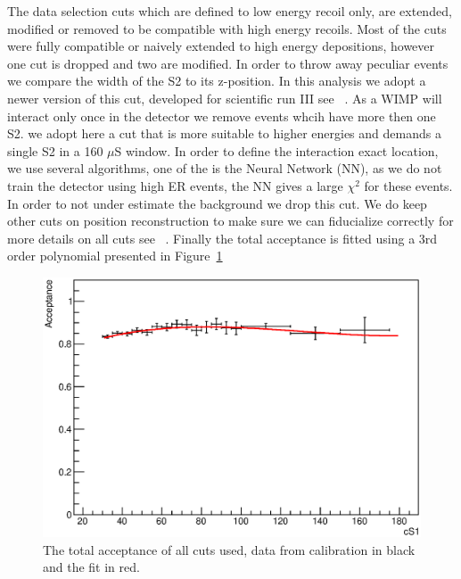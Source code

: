 The data selection cuts which are defined to low energy recoil only, are extended, modified or removed to be compatible with high energy recoils. Most of the cuts were fully compatible or naively extended to high energy depositions, however one cut is dropped and two are modified. In order to throw away peculiar events we compare the width of the S2 to its z-position. In this analysis we adopt a newer version of this cut, developed for scientific run III see ~\cite{xe100_run_combination}. As a WIMP will interact only once in the detector we remove events whcih have more then one S2. we adopt here a cut that is more suitable to higher energies and demands a single S2 in a 160 $\mu$S window. In order to define the interaction exact location, we use several algorithms, one of the is the Neural Network (NN), as we do not train the detector using high ER events, the NN gives a large $\chi^2$ for these events. In order to not under estimate the background we drop this cut. We do keep other cuts on position reconstruction to make sure we can fiducialize correctly for more details on all cuts see ~\cite{xe100_ana2012}. Finally the total acceptance is fitted using a 3rd order polynomial presented in Figure~\ref{fig:Acc}

\begin{figure}[h!]
\begin{minipage}{1.\linewidth}
\centerline{\includegraphics[width=1.\linewidth]{Figures/Acceptance.eps}}
\end{minipage}
\caption{The total acceptance of all cuts used, data from calibration in black and the fit in red.}
\label{fig:Acc}
\end{figure}

